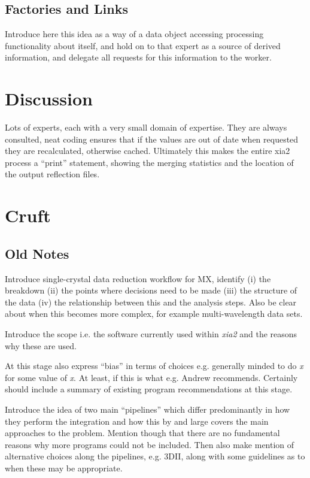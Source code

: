 \documentclass[a4paper,11pt]{article}
\begin{document}
\subsection{Factories and Links}

Introduce here this idea as a way of a data object accessing
processing functionality about itself, and hold on to that expert as a
source of derived information, and delegate all requests for this
information to the worker.

\section{Discussion}

Lots of experts, each with a very small domain of expertise. They are
always consulted, neat coding ensures that if the values are out of
date when requested they are recalculated, otherwise
cached. Ultimately this makes the entire xia2 process a ``print''
statement, showing the merging statistics and the location of the
output reflection files.

\section{Cruft}

\subsection{Old Notes}

Introduce single-crystal data reduction workflow for MX, identify (i)
the breakdown (ii) the points where decisions need to be made (iii)
the structure of the data (iv) the relationship between this and the
analysis steps. Also be clear about when this becomes more complex,
for example multi-wavelength data sets.

Introduce the scope i.e. the software currently used within \emph{xia2} and
the reasons why these are used.

At this stage also express ``bias'' in terms of choices e.g. generally
minded to do \emph{x} for some value of \emph{x}. At least, if this is
what e.g. Andrew recommends. Certainly should include a summary of
existing program recommendations at this stage.

Introduce the idea of two main ``pipelines'' which differ
predominantly in how they perform the integration and how this by and
large covers the main approaches to the problem. Mention though that
there are no fundamental reasons why more programs could not be
included. Then also make mention of alternative choices along the
pipelines, e.g. 3DII, along with some guidelines as to when these may
be appropriate.
\end{document}
